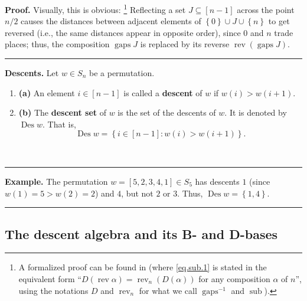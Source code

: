 \documentclass[12pt]{article}
\theoremstyle{definition}%
\theoremstyle{definition}%
\newtheorem{defn}[thm]{Definition}
\newtheorem{exmp}[thm]{Example}
\theoremstyle{remark}%
\newcommand{\tup}[1]{\left( #1 \right)}
\newcommand{\interval}[1]{\left[ #1 \right]} %
\newcommand{\ponl}[1]{\left[ #1 \right]} %
\newcommand{\set}[1]{\left\{ #1 \right\}}
\newcommand{\Des}{\operatorname{Des}}
\newcommand{\gaps}{\operatorname{gaps}}
\newcommand{\sub}{\operatorname{sub}}
\newcommand{\rev}{\operatorname{rev}}
\newcommand{\defin}[1]{\textbf{#1}}
\newenvironment{defn}[1][Definition]{\noindent\textbf{#1.} }{\ \rule{0.5em}{0.5em}}
\newenvironment{exmp}[1][Example]{\noindent\textbf{#1.} }{\ \rule{0.5em}{0.5em}}
\newenvironment{proof}[1][Proof]{\noindent\textbf{#1.} }{\ \rule{0.5em}{0.5em}}
\begin{document}
\begin{proof}
Visually, this is obvious:%
\footnote{A formalized proof can be found in \cite[ancillary file comps-compiled.pdf, Theorem 3.8 (i), Corollary 3.10]{GriVas24} (where \eqref{eq.sub.1} is stated in the equivalent form ``$D\tup{\rev \alpha} = \rev_n\tup{D\tup{\alpha}}$ for any composition $\alpha$ of $n$'', using the notations $D$ and $\rev_n$ for what we call $\gaps^{-1}$ and $\sub$).}
Reflecting a set $J \subseteq \interval{n-1}$ across the point $n/2$ causes the distances between adjacent elements of $\set{0} \cup J \cup \set{n}$ to get reversed (i.e., the same distances appear in opposite order), since $0$ and $n$ trade places;
thus, the composition $\gaps J$ is replaced by its reverse $\rev \tup{\gaps J}$.
\end{proof}

\begin{defn}[Descents]
    Let $w \in S_n$ be a permutation.
    \begin{enumerate}[]
    \item\textbf{(a)} An element $i \in \interval{n-1}$ is called a \defin{descent} of $w$ if $w\tup{i} > w\tup{i+1}$.
    \item\textbf{(b)} The \defin{descent set} of $w$ is the set of the descents of $w$.
	It is denoted by $\Des w$.
	That is,
    \[
    \Des w = \set{i \in \interval{n-1} : w\tup{i} > w\tup{i+1}} .
    \]
    \end{enumerate}
\end{defn}

\begin{exmp}
    The permutation $w = \ponl{ 5,2,3,4,1 } \in S_{5}$ has descents $ 1 $ (since $ w\tup{ 1 }=5 > w\tup{ 2 }=2 $) and $4$, but not $ 2 $ or $ 3 $.
	Thus, $ \Des w = \set{1,4} $.
\end{exmp}


\subsection{The descent algebra and its B- and D-bases}
\end{document}
